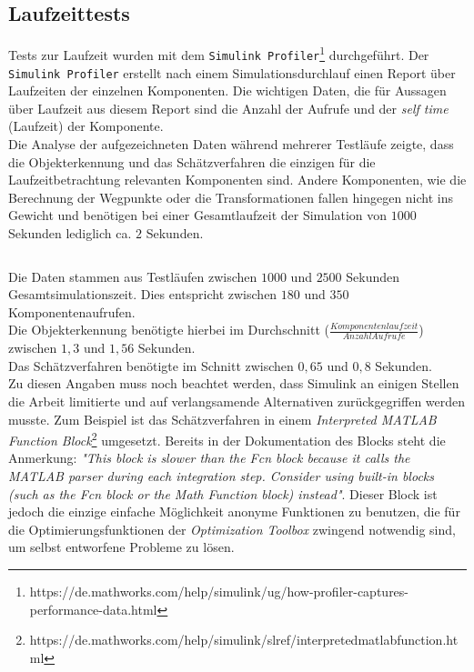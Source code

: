 \subsection{Laufzeittests}
\label{sec_laufzeit}
Tests zur Laufzeit wurden mit dem \texttt{Simulink Profiler}\footnote{https://de.mathworks.com/help/simulink/ug/how-profiler-captures-performance-data.html} durchgeführt. Der \texttt{Simulink Profiler} erstellt nach einem Simulationsdurchlauf einen Report über Laufzeiten der einzelnen Komponenten. Die wichtigen Daten, die für Aussagen über Laufzeit aus diesem Report sind die Anzahl der Aufrufe und der \textit{self time} (Laufzeit) der Komponente.\\
Die Analyse der aufgezeichneten Daten während mehrerer Testläufe zeigte, dass die Objekterkennung und das Schätzverfahren die einzigen für die Laufzeitbetrachtung relevanten Komponenten sind. Andere Komponenten, wie die Berechnung der Wegpunkte oder die Transformationen fallen hingegen nicht ins Gewicht und benötigen bei einer Gesamtlaufzeit der Simulation von $1000$ Sekunden lediglich ca. $2$ Sekunden. 

\begin{verbatim}

\end{verbatim}
Die Daten stammen aus Testläufen zwischen $1000$ und $2500$ Sekunden Gesamtsimulationszeit. Dies entspricht zwischen $180$ und $350$ Komponentenaufrufen.\\
Die Objekterkennung benötigte hierbei im Durchschnitt ($\frac{Komponentenlaufzeit}{Anzahl Aufrufe}$) zwischen $1,3$ und $1,56$ Sekunden.\\
Das Schätzverfahren benötigte im Schnitt zwischen $0,65$ und $0,8$ Sekunden.\\

Zu diesen Angaben muss noch beachtet werden, dass Simulink an einigen Stellen die Arbeit limitierte und auf verlangsamende Alternativen zurückgegriffen werden musste. Zum Beispiel ist das Schätzverfahren in einem \textit{Interpreted MATLAB Function Block}\footnote{https://de.mathworks.com/help/simulink/slref/interpretedmatlabfunction.html} umgesetzt. Bereits in der Dokumentation des Blocks steht die Anmerkung: \textit{"This block is slower than the Fcn block because it calls the MATLAB parser during each integration step. Consider using built-in blocks (such as the Fcn block or the Math Function block) instead"}. Dieser Block ist jedoch die einzige einfache Möglichkeit anonyme Funktionen zu benutzen, die für die Optimierungsfunktionen der \textit{Optimization Toolbox} zwingend notwendig sind, um selbst entworfene Probleme zu lösen.

%

